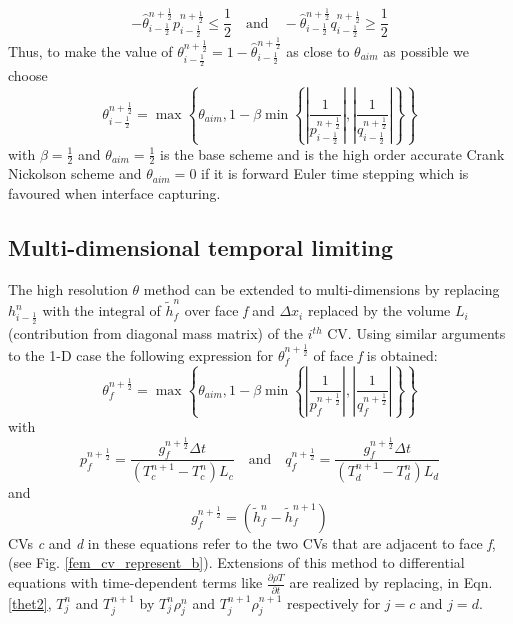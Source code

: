 \begin{equation}
- \widehat{\theta}_{i-\frac{1}{2}}^{n+\frac{1}{2}}
p_{i-\frac{1}{2}}^{n+\frac{1}{2}} \leq \frac{1}{2} \quad \text{and} \quad
- \widehat{\theta}_{i-\frac{1}{2}}^{n+\frac{1}{2}}
q_{i-\frac{1}{2}}^{n+\frac{1}{2}} \geq
\frac{1}{2}
\label{half}
\end{equation}
Thus, to make the value of $\theta_{i-\frac{1}{2}}^{n+\frac{1}{2}}= 1 - \widehat{\theta}_{i-\frac{1}{2}}^{n+\frac{1}{2}}$ as close to $\theta_{aim}$ as possible we choose
\begin{displaymath}
\theta_{i-\frac{1}{2}}^{n+\frac{1}{2}} = \max \left\{ \theta_{aim},
1 - \beta \min \left\{ \left|\frac{1}{p_{i-\frac{1}{2}}^{n+\frac{1}{2}}}\right|,
\left|\frac{1}{q_{i-\frac{1}{2}}^{n+\frac{1}{2}}} \right| \right\} \right\}
\end{displaymath}
with $\beta=\frac{1}{2}$ and $\theta_{aim}=\frac{1}{2}$ is the base scheme and is the
high order accurate Crank Nickolson scheme and $\theta_{aim}=0$ if it is forward Euler time
stepping which is favoured when interface capturing.

\subsection{Multi-dimensional temporal limiting}
\label{multidimtemplim}

The high resolution $\theta$ method can be extended to multi-dimensions by replacing $h_{i-\frac{1}{2}}^{n}$ with the integral of $\tilde{h}_{f}^{n}$ over face \textit{f} and $\Delta x_{i}$ replaced by the volume $L_{i}$ (contribution from diagonal mass matrix) of the $i^{th}$ CV. Using similar arguments to the 1-D case the following expression for $\theta_f^{n+\frac{1}{2}}$ of face \textit{f} is obtained:
\begin{equation}
\theta_f^{n+\frac{1}{2}}=\max \left\{ \theta_{aim}, 1 - \beta \min\left\{
\left|\frac{1}{p_{f}^{n+\frac{1}{2}}}\right|,\left|
\frac{1}{q_{f}^{n+\frac{1}{2}}} \right| \right\} \right\}
\label{thet1}
\end{equation}
with
\begin{equation}
p_f^{n+\frac{1}{2}} =
\frac{g_f^{n+\frac{1}{2}}\Delta t}{(T^{n+1}_{c} - T_{c}^{n}) L_{c}}
\quad \text{and} \quad q_f^{n+\frac{1}{2}} =
\frac{g_f^{n+\frac{1}{2}}\Delta t}{(T^{n+1}_{d} - T_{d}^{n}) L_{d}}
\label{thet2}
\end{equation}
and
\begin{equation}
g_f^{n+\frac{1}{2}}= (\tilde{h}_{f}^{n} - \tilde{h}_f^{n+1})
\label{gf}
\end{equation}
CVs \textit{c} and \textit{d} in these equations refer to the two CVs that are adjacent to face \textit{f}, (see Fig. \ref{fem_cv_represent_b}). Extensions of this method to differential equations with time-dependent terms like $\frac{\partial \rho T}{\partial t}$ are realized by replacing, in Eqn. \ref{thet2}, $T_j^n$ and $T_j^{n+1}$ by $T_{j}^{n} \rho_{j}^{n}$ and $T_{j}^{n+1} \rho_j^{n+1}$ respectively for $j = c$ and $j = d$.




